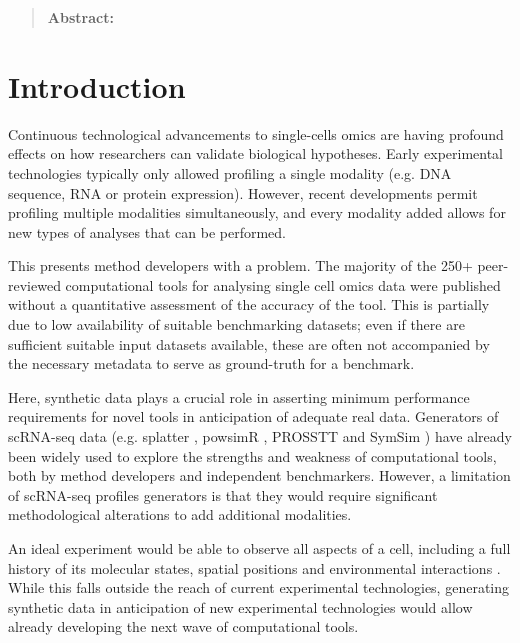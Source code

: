 
\begin{quote}
	\textbf{Abstract:} 
\end{quote}

\section{Introduction}
Continuous technological advancements to single-cells omics are having profound 
effects on how researchers can validate biological hypotheses. 
Early experimental technologies typically only allowed profiling a single modality (e.g. DNA sequence, 
RNA or protein expression). However, recent developments permit profiling multiple modalities simultaneously,
and every modality added allows for new types of analyses that can be performed.

This presents method developers with a problem. The majority of the 250+ peer-reviewed computational tools for analysing single cell omics data were published without a quantitative assessment of the accuracy of the tool. This is partially due to low availability of suitable benchmarking datasets; even if there are sufficient suitable input datasets available, these are often not accompanied by the necessary metadata to serve as ground-truth for a benchmark.

Here, synthetic data plays a crucial role in asserting minimum performance requirements for novel tools in anticipation of adequate real data. Generators of scRNA-seq data (e.g. splatter \cite{zappia_splattersimulationsinglecell_2017}, powsimR \cite{vieth_powsimrpoweranalysis_2017}, PROSSTT \cite{papadopoulos_prossttprobabilisticsimulation_2018} and SymSim \cite{zhang_simulatingmultiplefaceted_2019}) have already been widely used to explore the strengths and weakness of computational tools, both by method developers\cite{street_slingshotcelllineage_2018,parra_reconstructingcomplexlineage_2018,lummertzdarocha_reconstructioncomplexsinglecell_2018,lin_scclassifyhierarchicalclassification_2019} and independent benchmarkers\cite{duo_systematicperformanceevaluation_2018,saelens_comparisonsinglecelltrajectory_2019,soneson_biasrobustnessscalability_2018}.
However, a limitation of scRNA-seq profiles generators is that they would require significant methodological alterations to add additional modalities.

An ideal experiment would be able to observe all aspects of a cell, including a full history of its 
molecular states, spatial positions and environmental interactions \cite{stuart_integrativesinglecellanalysis_2019}.
While this falls outside the reach of current experimental technologies, generating synthetic data in anticipation of new experimental technologies would allow already developing the next wave of computational tools.

